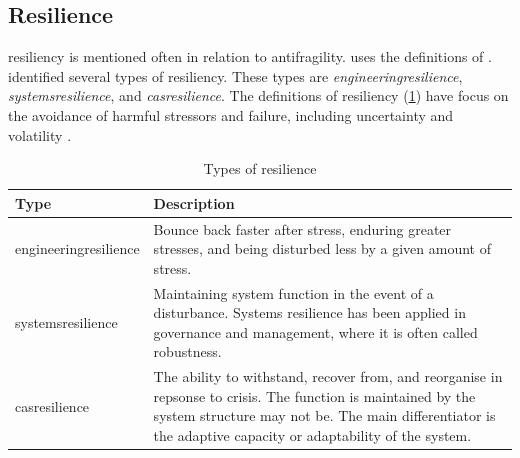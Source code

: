 \subsection{Resilience}
\label{sub:tbresilience}
\Gls{resiliency} is mentioned often in relation to \gls{antifragility}. \textcite[p.~3]{Botjes2021} uses the definitions of \textcite[pp.~5--8]{MartinBreen2011}. \textcite[pp.~5--8]{MartinBreen2011} identified several types of resiliency. These types are  \textit{\gls{engineeringresilience}}, \textit{\gls{systemsresilience}}, and \textit{\gls{casresilience}}. The definitions of \gls{resiliency} (\cref{tab:resiliencetypes}) have focus on the avoidance of harmful \glspl{stressor} and failure, including \gls{uncertainty} and \gls{volatility} \parencite[pp.~5--8]{MartinBreen2011}.
\begin{longtable}{p{}p{}}
	\toprule%
	\textbf{Type} & \textbf{Description} \\%
	\midrule%
	\endhead%
	\hline
	\endfoot%
	\caption[Types of resilience \parencite{MartinBreen2011}]{Types of resilience \parencite{MartinBreen2011}}
	\label{tab:resiliencetypes}
	\endlastfoot%
	\Gls{engineeringresilience} & Bounce back faster after stress, enduring greater stresses, and being disturbed less by a given amount of stress. \\%
	\Gls{systemsresilience} & Maintaining system function in the event of a disturbance. Systems resilience has been applied in governance and management, where it is often called robustness. \\%
	\Gls{casresilience} & The ability to withstand, recover from, and reorganise in repsonse to crisis. The function is maintained by the system structure may not be. The main differentiator is the adaptive capacity or adaptability of the system.\\%
	\bottomrule%
\end{longtable}
